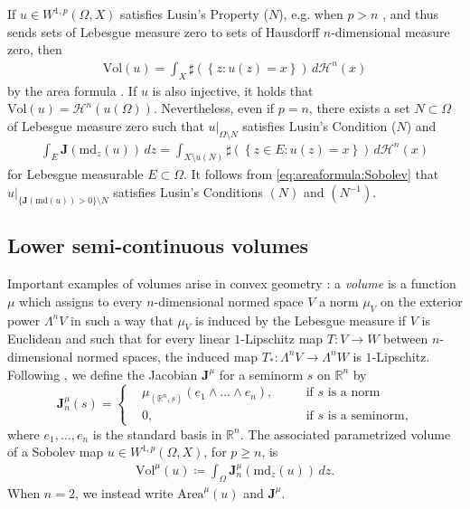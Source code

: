 \documentclass[a4paper,leqno]{amsart}
\numberwithin{equation}{section}
\theoremstyle{remark}
\theoremstyle{remark}
\newcommand{\R}{\mathbb{R}}
\begin{document}
If $u \in W^{1,p}( \Omega, X )$ satisfies Lusin's Property ($N$), e.g. when $p > n$ \cite{Vod:00}, and thus sends sets of Lebesgue measure zero to sets of Hausdorff $n$-dimensional measure zero, then
\begin{align*}
    \mathrm{Vol}(u) = \int_{X} \sharp( \left\{ z \colon u(z) =x \right\} ) \,d\mathcal{H}^n(x)
\end{align*}
by the area formula \cite[Theorem 3.2]{Karm:07}. If $u$ is also injective, it holds that $\mathrm{Vol}(u) = \mathcal{H}^{n}( u(\Omega) )$. Nevertheless, even if $p = n$, there exists a set $N \subset \Omega$ of Lebesgue measure zero such that $u|_{ \Omega \setminus N }$ satisfies Lusin's Condition ($N$) and
\begin{align}\label{eq:areaformula:Sobolev}
    \int_{E} \mathbf{J}( \mathrm{md}_z(u) ) \,dz
    =
    \int_{X \setminus u(N)} \sharp( \left\{ z \in E \colon u(z) = x \right\} ) \,d\mathcal{H}^n(x)
\end{align}
for Lebesgue measurable $E \subset \Omega$. It follows from \eqref{eq:areaformula:Sobolev} that $u|_{ \{ \mathbf{J}( \mathrm{md}(u)) > 0 \} \setminus N}$ satisfies Lusin's Conditions $(N)$ and $(N^{-1})$.



\subsection{Lower semi-continuous volumes}\label{section-lower-semi-continuous-volumes}
Important examples of volumes arise in convex geometry \cite{alvarez-thompson-2004-volumes-on-normed-and-finsler-spaces}: a \emph{volume} is a function $\mu$ which assigns to every $n$-dimensional normed space $V$ a norm $\mu_V$ on the exterior power $\Lambda^n V$ in such a way that $\mu_V$ is induced by the Lebesgue measure if $V$ is Euclidean and such that for every linear $1$-Lipschitz map $T \colon V \to W$ between $n$-dimensional normed spaces, the induced map $T_* \colon \Lambda^n V \to \Lambda^n W$ is $1$-Lipschitz. Following \cite{Lyt:Wen:17:areamini}, we define the Jacobian $\mathbf{J}^{\mu}$ for a seminorm $s$ on $\mathbb{R}^n$ by
\begin{equation*}
    \mathbf{J}^{\mu}_{n}(s)
    =
    \left\{
    \begin{split}
        &\mu_{ ( \mathbb{R}^n, s ) }( e_1 \wedge \dots \wedge e_n ), \quad&&\text{if $s$ is a norm}
        \\
        &0, \quad&&\text{if $s$ is a seminorm,}
    \end{split}
    \right.
\end{equation*}
where $e_1, \dots, e_n$ is the standard basis in $\R^n$. The associated parametrized volume of a Sobolev map $u \in W^{1,p}( \Omega, X )$, for $p \geq n$, is
\begin{align*}
    \mathrm{Vol}^\mu( u ) \coloneqq \int_{\Omega} \mathbf{J}^{\mu}_n( \mathrm{md}_z(u) ) \,dz.
\end{align*}
When $n = 2$, we instead write $\mathrm{Area}^{\mu}(u)$ and $\mathbf{J}^{\mu}$.
\end{document}
